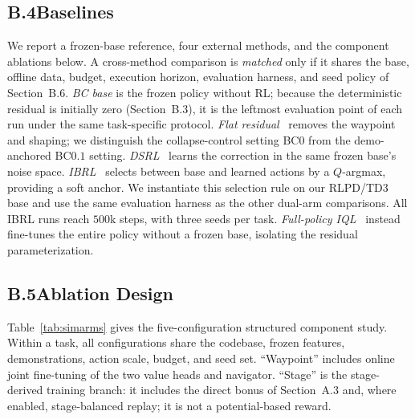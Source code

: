 \documentclass[letterpaper]{article} %
\begin{document}
\subsection{B.4\quad Baselines}

We report a frozen-base reference, four external methods, and the component
ablations below. A cross-method comparison is \emph{matched} only if it shares the
base, offline data, budget, execution horizon, evaluation harness, and seed policy
of Section~B.6. \emph{BC base} is the frozen policy without RL; because the
deterministic residual is initially zero (Section~B.3), it is the leftmost evaluation
point of each run under the same task-specific protocol. \emph{Flat
residual}~\cite{resfit2025residual} removes the waypoint and shaping; we distinguish
the collapse-control setting BC$0$ from the demo-anchored BC$0.1$ setting.
\emph{DSRL}~\cite{wagenmaker2025dsrl} learns the correction in the same frozen
base's noise space. \emph{IBRL}~\cite{hu2023imitation} selects between base and
learned actions by a $Q$-argmax, providing a soft anchor. We instantiate this
selection rule on our RLPD/TD3 base and use the same evaluation harness as the
other dual-arm comparisons. All IBRL runs reach $500$k steps, with three
seeds per task. \emph{Full-policy
IQL}~\cite{kostrikov2022iql} instead fine-tunes the entire policy without a frozen
base, isolating the residual parameterization.

\subsection{B.5\quad Ablation Design}

Table~\ref{tab:simarms} gives the five-configuration structured component
study. Within a task, all configurations share the codebase, frozen features,
demonstrations, action scale, budget, and seed set. ``Waypoint'' includes
online joint fine-tuning of the two value heads and navigator. ``Stage'' is the
stage-derived training branch: it includes the direct bonus of Section~A.3 and,
where enabled, stage-balanced replay; it is not a potential-based reward.
\end{document}
